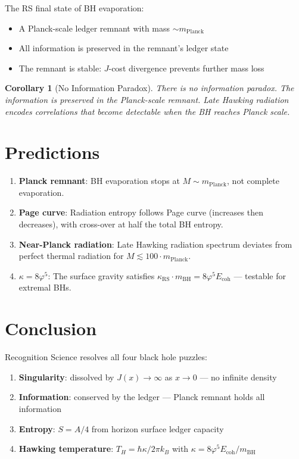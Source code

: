 \documentclass[12pt,a4paper]{article}
\newtheorem{corollary}[theorem]{Corollary}
\theoremstyle{definition}
\theoremstyle{remark}
\begin{document}
The RS final state of BH evaporation:
\begin{itemize}
\item A Planck-scale ledger remnant with mass $\sim m_\mathrm{Planck}$
\item All information is preserved in the remnant's ledger state
\item The remnant is stable: $J$-cost divergence prevents further mass loss
\end{itemize}

\begin{corollary}[No Information Paradox]
There is no information paradox. The information is preserved
in the Planck-scale remnant. Late Hawking radiation encodes correlations that
become detectable when the BH reaches Planck scale.
\end{corollary}

\section{Predictions}

\begin{enumerate}
\item \textbf{Planck remnant}: BH evaporation stops at $M \sim m_\mathrm{Planck}$, 
not complete evaporation.

\item \textbf{Page curve}: Radiation entropy follows Page curve (increases then decreases), 
with cross-over at half the total BH entropy.

\item \textbf{Near-Planck radiation}: Late Hawking radiation spectrum deviates from 
perfect thermal radiation for $M \lesssim 100 \cdot m_\mathrm{Planck}$.

\item \textbf{$\kappa = 8\varphi^5$}: The surface gravity satisfies 
$\kappa_\mathrm{RS} \cdot m_\mathrm{BH} = 8\varphi^5 E_\mathrm{coh}$ — testable 
for extremal BHs.
\end{enumerate}

\section{Conclusion}

Recognition Science resolves all four black hole puzzles:
\begin{enumerate}
\item \textbf{Singularity}: dissolved by $J(x) \to \infty$ as $x \to 0$ — no infinite density
\item \textbf{Information}: conserved by the ledger — Planck remnant holds all information
\item \textbf{Entropy}: $S = A/4$ from horizon surface ledger capacity
\item \textbf{Hawking temperature}: $T_H = \hbar\kappa/2\pi k_B$ with $\kappa = 8\varphi^5 E_\mathrm{coh}/m_\mathrm{BH}$
\end{enumerate}
\end{document}

